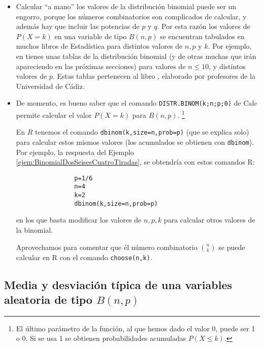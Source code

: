 \begin{itemize}
           \item Calcular ``a mano'' los valores de la distribución binomial puede ser un engorro, porque los números combinatorios son complicados de calcular, y además hay que incluir las potencias de $p$ y $q$. Por esta razón los valores de $P(X=k)$ en una variable de tipo $B(n,p)$ se encuentran tabulados en muchos libros de Estadística para distintos valores de $n, p$ y $k$. Por ejemplo, en  tienes unas tablas de la distribución binomial (y de otras muchas que irán apareciendo en las próximas secciones) para valores de $n\leq 10$, y distintos valores de $p$. Estas tablas pertenecen al libro , elaborado por profesores de la Universidad de Cádiz.


            \item De momento, es bueno saber que el comando {\tt DISTR.BINOM(k;n;p;0)} de Calc permite calcular el valor $P(X=k)$ para $B(n,p)$. \footnote{El último parámetro de la función, al que hemos dado el valor $0$, puede ser 1 o 0. Si se usa 1 se obtienen probabilidades acumuladas $P(X\leq k)$.}

                En $R$ tenemos el comando {\tt dbinom(k,size=n,prob=p)} (que se explica solo) para calcular estos mismos valores (los acumulados se obtienen con {\tt dbinom}).
                Por ejemplo, la respuesta del Ejemplo \ref{ejem:BinomialDosSeisesCuatroTiradas}, se obtendría con estos comandos R:
                \begin{verbatim}
                p=1/6
                n=4
                k=2
                dbinom(k,size=n,prob=p)
                \end{verbatim}
                en los que basta modificar los valores de $n,p,k$ para calcular otros valores de la binomial.

                Aprovechamos para comentar que él número combinatorio $\binom{n}{k}$ se puede calcular en R con el comando {\tt choose(n,k)}.

           \end{itemize}

           \subsection*{Media y desviación típica de una variables aleatoria de tipo $B(n,p)$}

